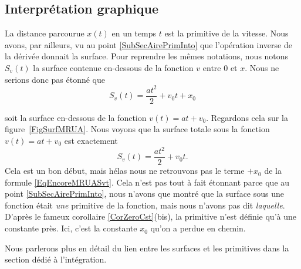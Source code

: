					\subsection{Interprétation graphique}

La distance parcourue $x(t)$ en un temps $t$ est la primitive de la vitesse. Nous avons, par ailleurs, vu au point \ref{SubSecAirePrimInto} que l'opération inverse de la dérivée donnait la surface. Pour reprendre les mêmes notations, nous notons $S_v(t)$ la surface contenue en-dessous de la fonction $v$ entre $0$ et $x$. Nous ne serions donc pas étonné que
\begin{equation}		\label{EqEncoreMRUASvt}
	S_v(t) = \frac{ at^2 }{ 2 }+v_0t+x_0
\end{equation}
\newcommand{\CaptionSurfMRUA}{La surface bleue est un triangle de base $t$ et de hauteur $at$, tandis que le rectangle rouge est de base $t$ et de hauteur $v_0$.}

soit la surface en-dessous de la fonction $v(t)=at+v_0$. Regardons cela sur la figure~\ref{FigSurfMRUA}. Nous voyons que la surface totale sous la fonction $v(t)=at+v_0$ est exactement
\begin{equation}
	S_v(t)=\frac{ at^2 }{ 2 }+v_0t.
\end{equation}
Cela est un bon début, mais hélas nous ne retrouvons pas le terme \og $+x_0$\fg{} de la formule \eqref{EqEncoreMRUASvt}. Cela n'est pas tout à fait étonnant parce que au point \ref{SubSecAirePrimInto}, nous n'avons que montré que la surface sous une fonction était \emph{une} primitive de la fonction, mais nous n'avons pas dit \emph{laquelle}. D'après le fameux corollaire \ref{CorZeroCst}(bis), la primitive n'est définie qu'à une constante près. Ici, c'est la constante $x_0$ qu'on a perdue en chemin.

Nous parlerons plus en détail du lien entre les surfaces et les primitives dans la section dédié à l'intégration.


\label{LaFin}
